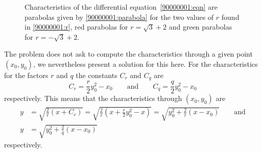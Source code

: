 \begin{loesung}
\begin{figure}
\caption{Characteristics of the differential equation~\eqref{90000001:eqn}
are parabolas given by \eqref{90000001:parabola} for the two values
of $r$ found in \eqref{90000001:r}, red parabolas for $r=\sqrt{3}+2$ and
green parabolas for $r=-\sqrt{3}+2$.
\label{90000001:char}}
\end{figure}
The problem does not ask to compute the characteristics through a given
point $(x_0,y_0)$, we nevertheless present a solution for this here.
For the characteristics for the factors $r$ and $q$ the constants
$C_r$ and $C_q$ are
\[
C_r=\frac{r}{2}y_0^2-x_0
\qquad
\text{and}
\qquad
C_q=\frac{q}{2}y_0^2-x_0
\]
respectively.
This means that the characteristics through 
$(x_0,y_0)$ are
\begin{align*}
y&=\sqrt{
\frac2r(x+C_r)
}
=
\sqrt{
\frac2r(x+
\frac{r}{2}y_0^2-x
)
}
=\sqrt{y_0^2+\frac2r(x-x_0)}
\qquad\text{and}
\\
y&
=\sqrt{y_0^2+\frac2q(x-x_0)}
\end{align*}
respectively.
\end{loesung}
